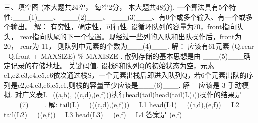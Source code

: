 三、填空图 (本大题共24空， 每空2分， 本大题共48分). 一个算法具有5个特性:\_\_\_(1)\_\_\_、 \_\_\_(2)\_\_\_、 \_\_\_(3)\_\_\_、有0个或多个输入、有一个或多个输出。\newline
解：\newline
有穷性，确定性，可行性. 设循环队列的容量为70，front指向队头， rear指向队尾的下一个位置。现经过一些列的入队和出队操作后，front为20， rear为 11， 则队列中元素的个数为\_\_\_(4)\_\_\_.\newline
解：\newline
应该有61元素 (Q.rear - Q.front + MAXSIZE) \% MAXISZE \newline 
[0,1,...10, , , , , 20,21,22,...,69] . 散列存储的基本思想是由 \_\_\_(5)\_\_\_确定记录的存储地址。\newline
关键码值. 设栈S和队列Q的初始状态为空，元素e1,e2,e3,e4,e5,e6依次通过栈S，一个元素出栈后即进入队列Q，若6个元素出队的序列是e2,e4,e3,e6,e5,e1,则栈的容量至少应该是\_\_\_(6)\_\_\_. \newline
解：\newline 
应该是 3 手动模拟. 对广义表L=((a,b), ((c,d),(e,f)))执行head(tail(head(tail(L))))操作的结果是\_\_\_(7)\_\_\_. \newline
解:\newline
tail(L) = (((c,d),(e,f))) = L1 \newline
head(L1) = ((c,d),(e,f)) = L2 \newline
tail(L2) = ((e,f)) = L3 \newline
head(L3) = (e,f) = L4 \newline
答案是   (e,f) \newline

